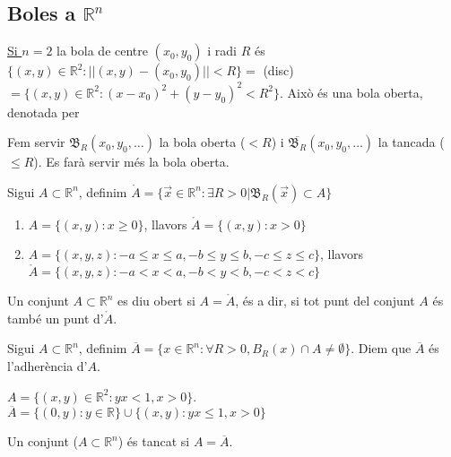 \documentclass[../main.tex]{subfiles}
\begin{document}
    \subsection{Boles a \texorpdfstring{$\mathbb{R}^n$}{Diverses dimensions}}
    \underline{Si $n=2$} la bola de centre $(x_0, y_0)$ i radi $R$ és $\{(x,y) \in \mathbb{R}^2: ||(x,y)-(x_0, y_0)|| < R\} =$
    (disc) $= \{(x,y)\in \mathbb{R}^2: (x-x_0)^2+(y-y_0)^2<R^2\}$. Això és una bola oberta, denotada per
    \begin{notacio}
        Fem servir $\mathfrak{B}_R(x_0, y_0, \dots)$ la bola oberta ($< R$) i $\overline{\mathfrak{B}_R}(x_0, y_0, \dots)$
        la tancada ($\leq R$). Es farà servir més la bola oberta.
    \end{notacio}
    \begin{definicio}
        Sigui $A \subset \mathbb{R}^n$, definim $\mathring{A} = \{\vec{x} \in \mathbb{R}^n : \exists R > 0 | \mathfrak{B}_R(\vec{x}) \subset A\}$
    \end{definicio}
    \begin{exemple}
        \begin{enumerate}
            \item $A = \{(x,y):x \geq 0\}$, llavors $\mathring{A} = \{(x,y):x > 0\}$
            \item $A = \{(x,y,z):-a \leq x \leq a, -b \leq y \leq b, -c \leq z \leq c\}$, llavors
            $\mathring{A} = \{(x,y,z):-a < x < a, -b < y < b, -c < z < c\}$
        \end{enumerate}
    \end{exemple}
    \begin{definicio}
        Un conjunt $A \subset \mathbb{R}^n$ es diu obert si $A = \mathring{A}$, és a dir, si tot
        punt del conjunt $A$ és també un punt d'$\mathring{A}$.
    \end{definicio}
    \begin{definicio}
        Sigui $A \subset \mathbb{R}^n$, definim $\overline{A} = \{ x \in \mathbb{R}^n : \forall R>0, B_R(x) \cap A \neq \emptyset\}$.
        Diem que $\overline{A}$ és l'adherència d'$A$.
    \end{definicio}
    \begin{exemple}
        $A = \{(x,y) \in \mathbb{R}^2: yx < 1, x > 0\}$. $\overline{A} = \{(0, y): y\in \mathbb{R}\} \cup \{(x, y): yx \leq 1, x > 0\}$
    \end{exemple}
    \begin{definicio}
        Un conjunt ($A \subset \mathbb{R}^n$) és tancat si $A = \overline{A}$.
    \end{definicio}
\end{document}
